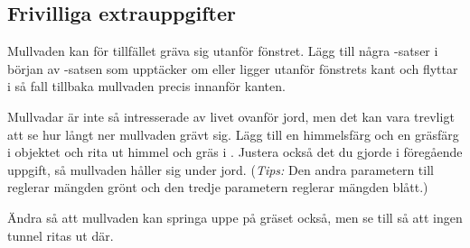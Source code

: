 \subsection{Frivilliga extrauppgifter}

\Task
Mullvaden kan för tillfället gräva sig utanför fönstret.
Lägg till några -satser i början av -satsen som upptäcker om  eller  ligger utanför fönstrets kant och flyttar i så fall tillbaka mullvaden precis innanför kanten.

\Task
Mullvadar är inte så intresserade av livet ovanför jord, men det kan vara trevligt att se hur långt ner mullvaden grävt sig.
Lägg till en himmelsfärg och en gräsfärg i objektet  och rita ut himmel och gräs i .
Justera också det du gjorde i föregående uppgift, så mullvaden håller sig under jord.
(\emph{Tips:} Den andra parametern till  reglerar mängden grönt och den tredje parametern reglerar mängden blått.)

\Task
Ändra så att mullvaden kan springa uppe på gräset också, men se till så att ingen tunnel ritas ut där.

